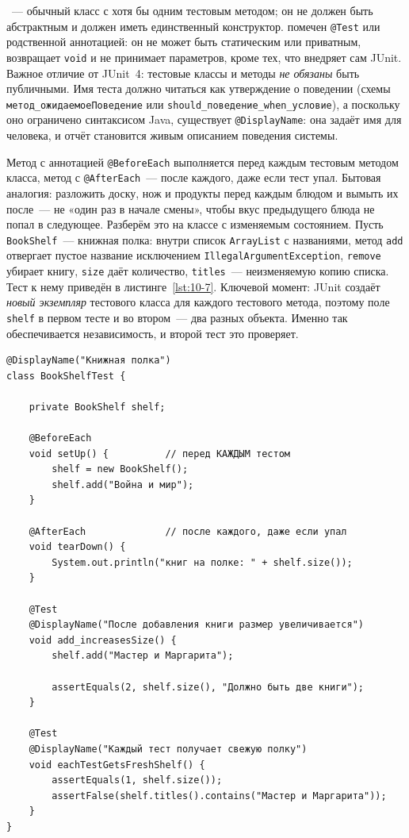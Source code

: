 ~--- обычный класс с хотя бы одним тестовым методом; он не должен быть абстрактным и должен иметь единственный конструктор.  помечен \texttt{@Test} или родственной аннотацией: он не может быть статическим или приватным, возвращает \texttt{void} и не принимает параметров, кроме тех, что внедряет сам JUnit. Важное отличие от JUnit~4: тестовые классы и методы \emph{не обязаны} быть публичными. Имя теста должно читаться как утверждение о поведении (схемы \texttt{метод\_ожидаемоеПоведение} или \texttt{should\_поведение\_when\_условие}), а поскольку оно ограничено синтаксисом Java, существует \texttt{@DisplayName}: она задаёт имя для человека, и отчёт становится живым описанием поведения системы.

Метод с аннотацией \texttt{@BeforeEach} выполняется перед каждым тестовым методом класса, метод с \texttt{@AfterEach}~--- после каждого, даже если тест упал. Бытовая аналогия: разложить доску, нож и продукты перед каждым блюдом и вымыть их после~--- не «один раз в начале смены», чтобы вкус предыдущего блюда не попал в следующее. Разберём это на классе с изменяемым состоянием. Пусть \texttt{BookShelf}~--- книжная полка: внутри список \texttt{ArrayList} с названиями, метод \texttt{add} отвергает пустое название исключением \texttt{IllegalArgumentException}, \texttt{remove} убирает книгу, \texttt{size} даёт количество, \texttt{titles}~--- неизменяемую копию списка. Тест к нему приведён в листинге~\ref{lst:10-7}. Ключевой момент: JUnit создаёт \emph{новый экземпляр} тестового класса для каждого тестового метода, поэтому поле \texttt{shelf} в первом тесте и во втором~--- два разных объекта. Именно так обеспечивается независимость, и второй тест это проверяет.

\begin{listing}[H]
\begin{verbatim}
@DisplayName("Книжная полка")
class BookShelfTest {

    private BookShelf shelf;

    @BeforeEach
    void setUp() {          // перед КАЖДЫМ тестом
        shelf = new BookShelf();
        shelf.add("Война и мир");
    }

    @AfterEach              // после каждого, даже если упал
    void tearDown() {
        System.out.println("книг на полке: " + shelf.size());
    }

    @Test
    @DisplayName("После добавления книги размер увеличивается")
    void add_increasesSize() {
        shelf.add("Мастер и Маргарита");

        assertEquals(2, shelf.size(), "Должно быть две книги");
    }

    @Test
    @DisplayName("Каждый тест получает свежую полку")
    void eachTestGetsFreshShelf() {
        assertEquals(1, shelf.size());
        assertFalse(shelf.titles().contains("Мастер и Маргарита"));
    }
}
\end{verbatim}
\caption{Тест с аннотациями жизненного цикла}
\label{lst:10-7}
\end{listing}

